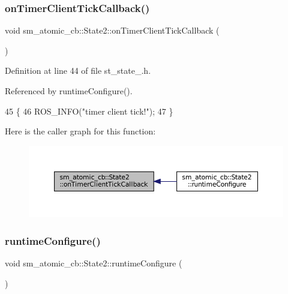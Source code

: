 \subsubsection{\texorpdfstring{on\+Timer\+Client\+Tick\+Callback()}{onTimerClientTickCallback()}}
{\footnotesize\ttfamily void sm\+\_\+atomic\+\_\+cb\+::\+State2\+::on\+Timer\+Client\+Tick\+Callback (\begin{DoxyParamCaption}{ }\end{DoxyParamCaption})\hspace{0.3cm}{\ttfamily [inline]}}



Definition at line 44 of file st\+\_\+state\+\_.\+h.



Referenced by runtime\+Configure().


\begin{DoxyCode}
45     \{
46         ROS\_INFO(\textcolor{stringliteral}{"timer client tick!"});
47     \}
\end{DoxyCode}
Here is the caller graph for this function\+:
\nopagebreak
\begin{figure}[H]
\begin{center}
\leavevmode
\includegraphics[width=350pt]{structsm__atomic__cb_1_1State2_a9367ee51725a8f2e8cdbf7d922cf9108_icgraph}
\end{center}
\end{figure}
\mbox{\label{structsm__atomic__cb_1_1State2_a47560e2531cd7d9ae1ab2da6e7bc47d0}} 
\subsubsection{\texorpdfstring{runtime\+Configure()}{runtimeConfigure()}}
{\footnotesize\ttfamily void sm\+\_\+atomic\+\_\+cb\+::\+State2\+::runtime\+Configure (\begin{DoxyParamCaption}{ }\end{DoxyParamCaption})\hspace{0.3cm}{\ttfamily [inline]}}



